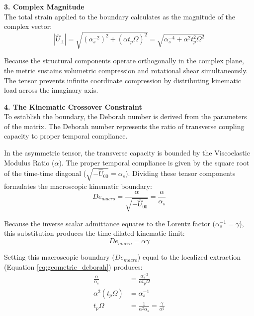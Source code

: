 \textbf{3. Complex Magnitude} \\
The total strain applied to the boundary calculates as the magnitude of the complex vector:
\begin{equation}
    |\hat{U}_{\perp}| = \sqrt{(\alpha_s^{-2})^2 + (\alpha t_p \Omega)^2} = \sqrt{\alpha_s^{-4} + \alpha^2 t_p^2 \Omega^2}
\end{equation}

Because the structural components operate orthogonally in the complex plane, the metric sustains volumetric compression and rotational shear simultaneously. The tensor prevents infinite coordinate compression by distributing kinematic load across the imaginary axis.

\vspace{0.2 cm}

\textbf{4. The Kinematic Crossover Constraint} \\ 
To establish the boundary, the Deborah number is derived from the parameters of the matrix. The Deborah number represents the ratio of transverse coupling capacity to proper temporal compliance. 

In the asymmetric tensor, the transverse capacity is bounded by the Viscoelastic Modulus Ratio ($\alpha$). The proper temporal compliance is given by the square root of the time-time diagonal ($\sqrt{-\hat{U}_{00}} = \alpha_s$). Dividing these tensor components formulates the macroscopic kinematic boundary: 
\begin{equation}
    De_{macro} = \frac{\alpha}{\sqrt{-\hat{U}_{00}}} = \frac{\alpha}{\alpha_s}
\end{equation}

Because the inverse scalar admittance equates to the Lorentz factor ($\alpha_s^{-1} = \gamma$), this substitution produces the time-dilated kinematic limit: 
\begin{equation}
    De_{macro} = \alpha \gamma
\end{equation}

Setting this macroscopic boundary ($De_{macro}$) equal to the localized extraction (Equation \ref{eq:geometric_deborah}) produces: 
\begin{align}
    \frac{\alpha}{\alpha_s} &= \frac{\alpha_s^{-2}}{\alpha t_p \Omega} \nonumber \\
    \alpha^2 (t_p \Omega) &= \alpha_s^{-1} \nonumber \\
    t_p \Omega &= \frac{1}{\alpha^2 \alpha_s} = \frac{\gamma}{\alpha^2}
\end{align}

